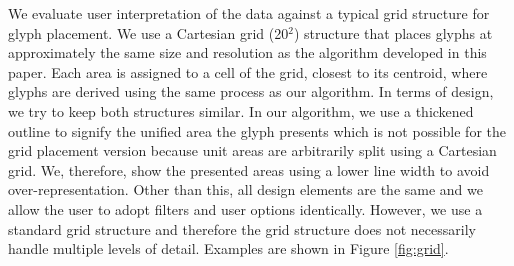 We evaluate user interpretation of the data against a typical grid structure for glyph placement. We use a Cartesian grid (20$^2$) structure that places glyphs at approximately the same size and resolution as the algorithm developed in this paper. Each area is assigned to a cell of the grid, closest to its centroid, where glyphs are derived using the same process as our algorithm. In terms of design, we try to keep both structures similar. In our algorithm, we use a thickened outline to signify the unified area the glyph presents which is not possible for the grid placement version because unit areas are arbitrarily split using a Cartesian grid. We, therefore, show the presented areas using a lower line width to avoid over-representation. Other than this, all design elements are the same and we allow the user to adopt filters and user options identically. However, we use a standard grid structure and therefore the grid structure does not necessarily handle multiple levels of detail. Examples are shown in Figure \ref{fig:grid}.

